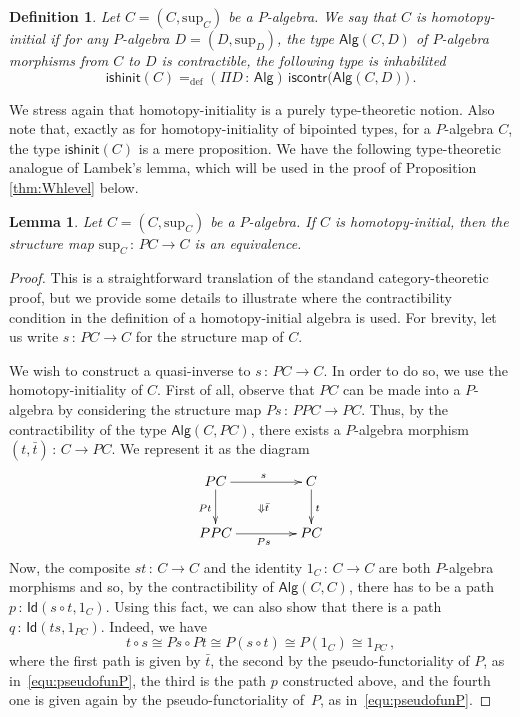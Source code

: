 \documentclass[10pt,a4paper,oneside,reqno]{amsart}
\numberwithin{equation}{section}
\theoremstyle{mythm}
\newtheorem{lemma}[theorem]{Lemma}
\theoremstyle{mydef}
\newtheorem{definition}[theorem]{Definition}
\theoremstyle{myrmk}
\newcommand{\ie}{\text{i.e.\ }}
\newcommand{\defeq}{=_{\mathrm{def}}}
\newcommand{\co}{\,{:}\,}
\newcommand{\iso}{\cong}
\newcommand{\iscontr}{\mathsf{iscontr}}
\newcommand{\isalghinit}{\mathsf{ishinit}}
\newcommand{\Id}{\mathsf{Id}}
\newcommand{\Palg}{\mathsf{Alg}}
\renewcommand{\sup}{\mathrm{sup}}
\begin{document}
\begin{definition}\label{def:AlgInit}
Let $C = (C, \sup_C)$ be a $P$-algebra. We say that $C$ is  \emph{homotopy-initial}  if for any $P$-algebra 
$D = (D, \sup_D)$, the type $\Palg(C,D)$ of $P$-algebra morphisms from $C$ to $D$
is contractible, \ie the following type is inhabilited
\[
\isalghinit(C) \defeq
 (\Pi D \co \Palg)  \, \iscontr \big( \Palg(C,D) \big)  \, .
\]  
\end{definition}

We stress again that homotopy-initiality is a purely type-theoretic notion. Also note that, exactly as for 
homotopy-initiality of bipointed types, for a $P$-algebra $C$, the type
$\isalghinit(C)$ is a mere proposition. 
We have the following type-theoretic analogue of Lambek's lemma, which will be used in the proof of Proposition \ref{thm:Whlevel} below.


\begin{lemma}\label{lem:IntLambek} Let $C = (C, \sup_C)$ be a $P$-algebra. 
If $C$ is homotopy-initial, then the structure map $\sup_C \co PC \to C$ is an equivalence.
\end{lemma}


\begin{proof} This is a straightforward translation of the standand category-theoretic proof, but we provide
some details to illustrate where the contractibility condition in the definition of a homotopy-initial algebra is
used. For brevity, let us write $s \co PC \to C$ for the structure map of $C$. 

 We wish to construct a quasi-inverse to $s \co PC \to C$. In order to do so, we use the homotopy-initiality
of $C$. First of all, observe that $PC$ can be made into a $P$-algebra by considering the structure map 
$Ps \co PPC \to PC$. Thus, by the contractibility of the type $\Palg(C, PC)$, there exists a $P$-algebra
morphism $(t, \bar{t}) \co C \to PC$. We represent it as the diagram
\begin{equation*}
\xymatrix@C=1.5cm{
PC \ar[d]_{Pt} \ar[r]^{s} \ar@{}[dr]|{\Downarrow \bar{t}}& C \ar[d]^{t} \\
PPC \ar[r]_{Ps} & PC}
\end{equation*}
Now, the composite $s  t \co C \to C$ and the identity $1_C \co C \to C$ are both $P$-algebra
morphisms and so, by the contractibility of $\Palg(C,C)$, there has to be a path $p \co \Id(s\circ t ,1_C)$. 
Using this fact, we can also show that there is a path $q \co \Id(t  s, 1_{PC})$. Indeed, we have
\[
t \circ s  \iso Ps \circ Pt 
 \iso P(s \circ t) 
 \iso P(1_C) 
  \iso 1_{PC} \, ,
\]
where the first path is given by $\bar{t}$, the second by the pseudo-functoriality of $P$, as in~\eqref{equ:pseudofunP},
the third is the path $p$ constructed above, and the fourth one is given again by the pseudo-functoriality of~$P$,
as in~\eqref{equ:pseudofunP}.
\end{proof}
\end{document}
